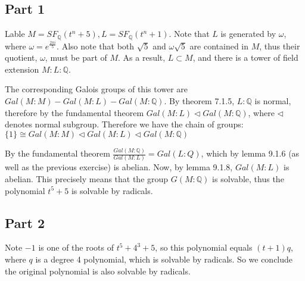 \documentclass{article}
\theoremstyle{definition}
\theoremstyle{definition}
\theoremstyle{remark}
\newcommand{\bb}[1]{\mathbb{#1}} %
\begin{document}
\subsection*{Part 1}
Lable $M = SF_{\bb{Q}}(t^n + 5), L =  SF_{\bb{Q}}(t^n + 1)$.
Note that $L$ is generated by $\omega$, where $\omega = e^{\frac{2\pi i}{5}}$.
Also note that both $\sqrt{5}$ and $\omega \sqrt{5}$ are contained in $M$, thus their quotient, $\omega$, must be part of $M$. 
As a result, $L \subset M$, and there is a tower of field extension $M : L : \bb{Q}$.

The corresponding Galois groups of this tower are  
$Gal(M : M) - Gal(M : L) - Gal(M : \bb{Q})$. 
By theorem 7.1.5, $L:\bb{Q}$ is normal, therefore by the fundamental theorem 
$ Gal(M: L) \triangleleft Gal(M: \bb{Q})$, where $\triangleleft$ denotes normal subgroup.
Therefore we have the chain of groups:
$\{1\} \cong Gal(M : M) \triangleleft Gal(M: L) \triangleleft Gal(M: \bb{Q})$

By the fundamental theorem $\frac{Gal(M: \bb{Q})}{Gal(M: L)} = Gal(L: Q)$, which by lemma 9.1.6 (as well as the previous exercise) is abelian.
Now, by lemma 9.1.8, $Gal(M:L)$ is abelian. 
This precisely means that the group $G(M: \bb{Q})$ is solvable, thus the polynomial $t^5 + 5$ is solvable by radicals.


\subsection*{Part 2}
Note $-1$ is one of the roots of $t^5 +4^3 + 5$, so this polynomial equals $(t+1)q$, where $q$ is a degree 4 polynomial, which is solvable by radicals. So we conclude the original polynomial is also solvable by radicals.
\end{document}
